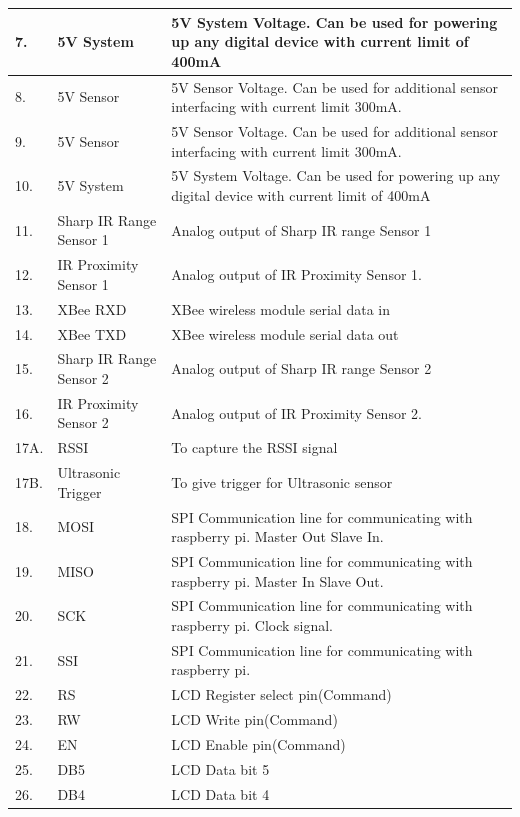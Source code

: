 \documentclass[a4paper,12pt,oneside]{book}
\begin{document}
\begin{tabular}{|p{2cm}|p{4cm}|p{10cm}|}

	\hline
	7. &5V System &5V System Voltage. Can be used for powering up any digital device with current limit of 400mA  \\ 
	\hline
8. &5V Sensor &5V Sensor Voltage. Can be used for additional sensor interfacing with current limit 300mA. \\ 
\hline
9. &5V Sensor &5V Sensor Voltage. Can be used for additional sensor interfacing with current limit 300mA. \\ 
\hline
	10. &5V System &5V System Voltage. Can be used for powering up any digital device with current limit of 400mA  \\ 
\hline
	11. &Sharp IR Range Sensor 1 &Analog output of Sharp IR range Sensor 1 \\ 
	\hline
12. &IR Proximity Sensor 1 &Analog output of IR Proximity Sensor 1. \\ 
\hline
	13. &XBee RXD & XBee wireless module serial data in  \\ 
	\hline
14. &XBee TXD & XBee wireless module serial data out  \\ 
\hline
15. &Sharp IR Range Sensor 2 &Analog output of Sharp IR range Sensor 2 \\ 
\hline
16. &IR Proximity Sensor 2 &Analog output of IR Proximity Sensor 2. \\ 
\hline
17A. &RSSI &To capture the RSSI signal \\
\hline
17B.& Ultrasonic Trigger& To give trigger for Ultrasonic sensor \\
\hline
18.& MOSI & SPI Communication line for communicating with raspberry pi. Master Out Slave In. \\
\hline
19.& MISO & SPI Communication line for communicating with raspberry pi. Master In Slave Out. \\
\hline
20.& SCK & SPI Communication line for communicating with raspberry pi. Clock signal. \\
\hline 
21.& SSI & SPI Communication line for communicating with raspberry pi. \\
\hline
22. & RS & LCD Register select pin(Command)\\
\hline
23. & RW & LCD Write pin(Command)\\
\hline
24. & EN & LCD Enable pin(Command)\\
\hline
25. & DB5 & LCD Data bit 5\\
\hline
26. & DB4 & LCD Data bit 4\\

\end{tabular}
\end{document}
